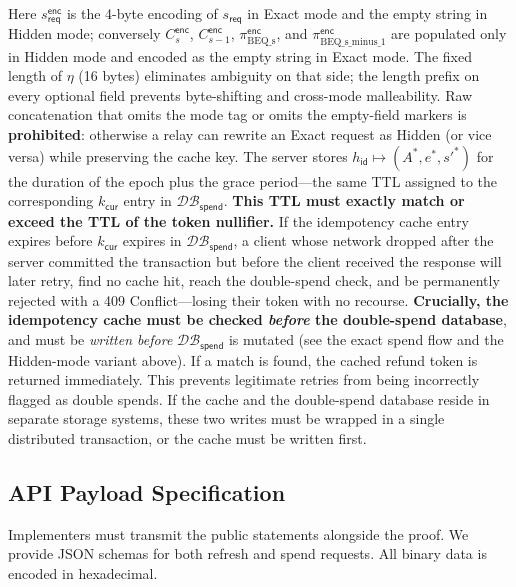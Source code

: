 \documentclass[11pt]{article}
\theoremstyle{definitionstyle}
\theoremstyle{plain}
\newcommand{\DB}{\mathcal{DB}}
\begin{document}
Here $s_{\mathsf{req}}^{\mathsf{enc}}$ is the 4-byte encoding of $s_{\mathsf{req}}$ in Exact mode and the empty string in Hidden mode; conversely $C_s^{\mathsf{enc}}$, $C_{s-1}^{\mathsf{enc}}$, $\pi_{\text{BEQ\_s}}^{\mathsf{enc}}$, and $\pi_{\text{BEQ\_s\_minus\_1}}^{\mathsf{enc}}$ are populated only in Hidden mode and encoded as the empty string in Exact mode. The fixed length of $\eta$ (16 bytes) eliminates ambiguity on that side; the length prefix on every optional field prevents byte-shifting and cross-mode malleability. Raw concatenation that omits the mode tag or omits the empty-field markers is \textbf{prohibited}: otherwise a relay can rewrite an Exact request as Hidden (or vice versa) while preserving the cache key. The server stores $h_{\mathsf{id}} \mapsto (A^*, e^*, s'^*)$ for the duration of the epoch plus the grace period---the same TTL assigned to the corresponding $k_{\mathsf{cur}}$ entry in $\DB_{\mathsf{spend}}$. \textbf{This TTL must exactly match or exceed the TTL of the token nullifier.} If the idempotency cache entry expires before $k_{\mathsf{cur}}$ expires in $\DB_{\mathsf{spend}}$, a client whose network dropped after the server committed the transaction but before the client received the response will later retry, find no cache hit, reach the double-spend check, and be permanently rejected with a 409 Conflict---losing their token with no recourse. \textbf{Crucially, the idempotency cache must be checked \emph{before} the double-spend database}, and must be \emph{written before} $\DB_{\mathsf{spend}}$ is mutated (see the exact spend flow and the Hidden-mode variant above). If a match is found, the cached refund token is returned immediately. This prevents legitimate retries from being incorrectly flagged as double spends. If the cache and the double-spend database reside in separate storage systems, these two writes must be wrapped in a single distributed transaction, or the cache must be written first.

\subsection{API Payload Specification}

Implementers must transmit the public statements alongside the proof. We provide JSON schemas for both refresh and spend requests. All binary data is encoded in hexadecimal.
\end{document}
